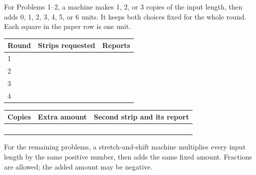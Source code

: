 \def\band{Grades 4--5}\def\packet{W94-U-v1}
\fontsize{12.5}{16.5}\selectfont
For Problems 1--2, a machine makes 1, 2, or 3 copies of the input length, then adds 0, 1, 2, 3, 4, 5, or 6 units. It keeps both choices fixed for the whole round. Each square in the paper row is one unit.
\begin{center}\affineexample\end{center}
\begin{center}\begin{tabular}{|p{2.6cm}|p{4.7cm}|p{5.8cm}|}\hline
Round & Strips requested & Reports \\\hline
1\rule{0pt}{9mm}&&\\\hline 2\rule{0pt}{9mm}&&\\\hline 3\rule{0pt}{9mm}&&\\\hline 4\rule{0pt}{9mm}&&\\\hline
\end{tabular}\end{center}
\begin{center}\unitrow\end{center}
\begin{center}\strips\end{center}
\newpage
{}
\begin{center}\begin{tabular}{|p{3.8cm}|p{3.8cm}|p{5.5cm}|}\hline
Copies & Extra amount & Second strip and its report \\\hline
\rule{0pt}{17mm}&&\\\hline\rule{0pt}{17mm}&&\\\hline\rule{0pt}{17mm}&&\\\hline\rule{0pt}{17mm}&&\\\hline
\end{tabular}\end{center}
\vspace{5mm}
\newpage
For the remaining problems, a stretch-and-shift machine multiplies every input length by the same positive number, then adds the same fixed amount. Fractions are allowed; the added amount may be negative.

